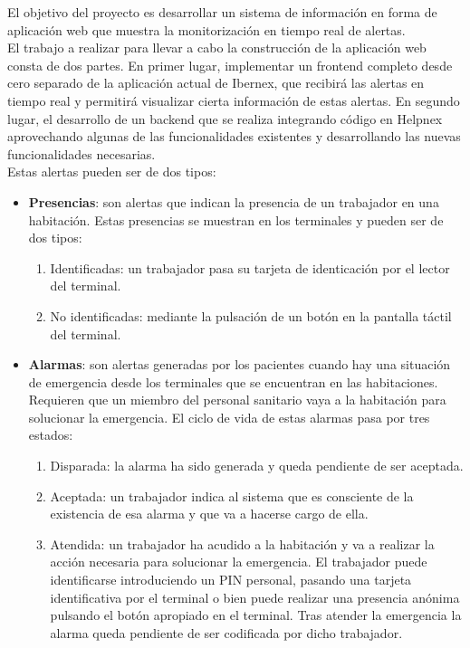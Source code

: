 El objetivo del proyecto es desarrollar un sistema de información en forma de aplicación web que muestra la monitorización en tiempo real de alertas. \\

El trabajo a realizar para llevar a cabo la construcción de la aplicación web consta de dos partes. En primer lugar, implementar un frontend completo desde cero separado de la aplicación actual de Ibernex, que recibirá las alertas en tiempo real y permitirá visualizar cierta información de estas alertas. En segundo lugar, el desarrollo de un backend que se realiza integrando código en Helpnex aprovechando algunas de las funcionalidades existentes y desarrollando las nuevas funcionalidades necesarias. \\

Estas alertas pueden ser de dos tipos:
\begin{itemize}
    \item \textbf{Presencias}: son alertas que indican la presencia de un trabajador en una habitación. Estas presencias se muestran en los terminales y pueden ser de dos tipos:
    \begin{enumerate}
        \item Identificadas: un trabajador pasa su tarjeta de identicación por el lector del terminal.
        \item No identificadas: mediante la pulsación de un botón en la pantalla táctil del terminal.
    \end{enumerate}
    \item \textbf{Alarmas}: son alertas generadas por los pacientes cuando hay una situación de
    emergencia desde los terminales que se encuentran en las habitaciones. Requieren que un miembro del personal sanitario vaya a la habitación para solucionar la emergencia.
    El ciclo de vida de estas alarmas pasa por tres estados:
    \begin{enumerate}
        \item Disparada: la alarma ha sido generada y queda pendiente de ser aceptada.
        \item Aceptada: un trabajador indica al sistema que es consciente de la existencia de esa alarma y que va a hacerse cargo de ella.
        \item Atendida: un trabajador ha acudido a la habitación y va a realizar la acción necesaria para solucionar la emergencia. El trabajador puede identificarse introduciendo un PIN personal, pasando una tarjeta identificativa por el terminal o bien puede realizar una presencia anónima pulsando el botón apropiado en el terminal. Tras atender la emergencia la alarma queda pendiente de ser codificada por dicho trabajador.
    \end{enumerate}    
\end{itemize}


